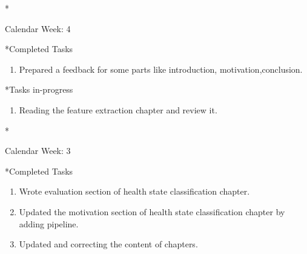 \documentclass[11pt,a4paper]{article}
\begin{document}
\newpage
\begin{section}*{Calendar Week: 4 \hfill \date{29 January, 2021}}


       \begin{subsection}*{Completed Tasks}
             \begin{enumerate}
                  \item 
                  Prepared a feedback for some parts like introduction, motivation,conclusion.
                 
             \end{enumerate}
                 
       \end{subsection}

       \begin{subsection}*{Tasks in-progress}
            \begin{enumerate}
                \item Reading the feature extraction chapter and review it.
            \end{enumerate}
        \end{subsection}
    \end{section}
    


\newpage
\begin{section}*{Calendar Week: 3 \hfill \date{22 January, 2021}}


       \begin{subsection}*{Completed Tasks}
             \begin{enumerate}
                  \item Wrote evaluation section of health state classification chapter.
                 \item Updated the motivation section of health state classification chapter by adding pipeline.
                 \item Updated and correcting the content of chapters.
             \end{enumerate}
                 
       \end{subsection}
\end{section}
\end{document}
